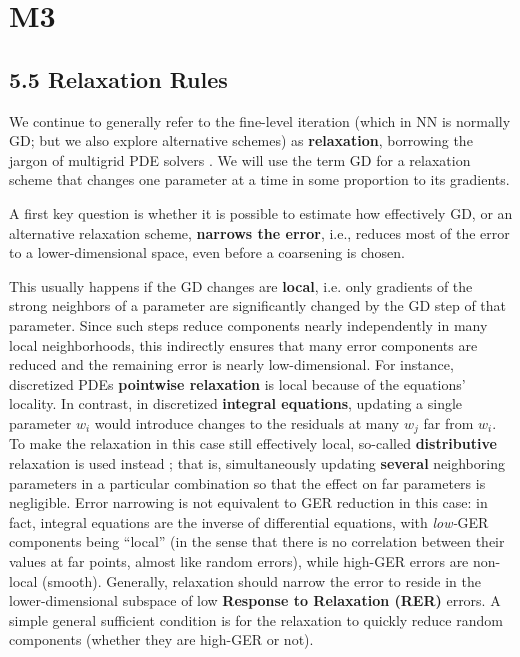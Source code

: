 \documentclass{article} %
\begin{document}
\section{M3}
\subsection{5.5 Relaxation Rules}
\label{sec:relaxation_rules}
We continue to generally refer to the fine-level iteration (which in NN is normally GD; but we also explore alternative schemes) as \textbf{relaxation}, borrowing the jargon of multigrid PDE solvers \cite[Sec.~1]{guide}. We will use the term GD for a relaxation scheme that changes one parameter at a time in some proportion to its gradients. 

A first key question is whether it is possible to estimate how effectively GD, or an alternative relaxation scheme, \textbf{narrows the error}, i.e., reduces most of the error to a lower-dimensional space, even before a coarsening is chosen. 

This usually happens if the GD changes are \textbf{local}, i.e. only gradients of the strong neighbors of a parameter are significantly changed by the GD step of that parameter. Since such steps reduce components nearly independently in many local neighborhoods, this indirectly ensures that many error components are reduced and the remaining error is nearly low-dimensional. For instance, discretized PDEs \textbf{pointwise relaxation} \cite[Sec.~1]{guide} is local because of the equations' locality. In contrast, in discretized \textbf{integral equations}, updating a single parameter $w_i$ would introduce changes to the residuals at many $w_j$ far from $w_i$. To make the relaxation in this case still effectively local, so-called \textbf{distributive} relaxation is used instead \cite{lubrecht}; that is, simultaneously updating \textbf{several} neighboring parameters in a particular combination so that the effect on far parameters is negligible. Error narrowing is not equivalent to GER reduction in this case: in fact, integral equations are the inverse of differential equations, with {\it low-}GER components being ``local'' (in the sense that there is no correlation between their values at far points, almost like random errors), while high-GER errors are non-local (smooth). Generally, relaxation should narrow the error to reside in the lower-dimensional subspace of low \textbf{Response to Relaxation (RER)} errors. A simple general sufficient condition is for the relaxation to quickly reduce random components (whether they are high-GER or not).
\end{document}
